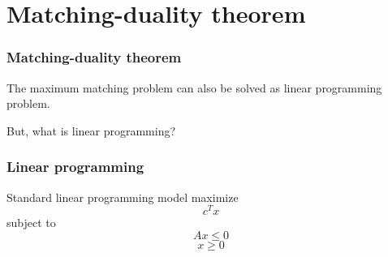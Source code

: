 \documentclass[hyperref={pdfpagelabels=false}]{beamer}
\begin{document}
\section{Matching-duality theorem}

\frame
{
	\frametitle{Matching-duality theorem}

	\huge{The maximum matching problem can also be solved as linear programming problem.}
	
	\bigskip
	
	\huge{But, what is linear programming?}
}

\frame
{
	\frametitle{Linear programming}

	\begin{block}{Standard linear programming model}
		maximize
		\begin{equation*}
		c^{T}x
		\end{equation*}
		subject to
		\begin{equation*}
		Ax \leq 0
	  	\end{equation*}
	  	\begin{equation*}
		x \geq 0
	  	\end{equation*}
	\end{block}
}
\end{document}
